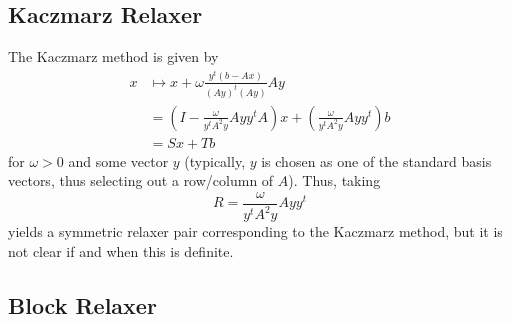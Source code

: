\documentclass{article}
\begin{document}
\subsection{Kaczmarz Relaxer}

The Kaczmarz method is given by
\begin{align*}
x & \mapsto x + \omega \frac{y^t \left( b - A x \right)}{\left( A y \right)^t \left( A y \right)} A y \\
  & = \left( I - \frac{\omega}{y^t A^2 y} A y y^t A \right) x + \left( \frac{\omega}{y^t A^2 y} A y y^t \right) b \\
  & = S x + T b
\end{align*}
for $\omega > 0$ and some vector $y$ (typically, $y$ is chosen as one of the standard basis vectors, thus selecting out a row/column of $A$). Thus, taking
\begin{equation*}
R = \frac{\omega}{y^t A^2 y} A y y^t
\end{equation*}
yields a symmetric relaxer pair corresponding to the Kaczmarz method, but it is not clear if and when this is definite.

\subsection{Block Relaxer}
\end{document}
